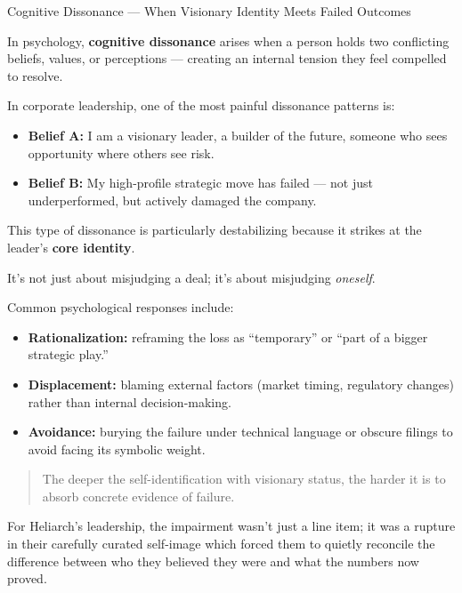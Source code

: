 \begin{PsychologicalSidebar}{Cognitive Dissonance --- When Visionary Identity Meets Failed Outcomes}

    In psychology, \textbf{cognitive dissonance} arises when a person holds two conflicting beliefs, values, or perceptions — creating an internal tension they feel compelled to resolve.
    
    \medskip
    
    In corporate leadership, one of the most painful dissonance patterns is:

    \medskip
    
    \begin{itemize}
        \item \textbf{Belief A:} I am a visionary leader, a builder of the future, someone who sees opportunity where others see risk.
        \item \textbf{Belief B:} My high-profile strategic move has failed — not just underperformed, but actively damaged the company.
    \end{itemize}
    
    \medskip
    
    This type of dissonance is particularly destabilizing because it strikes at the leader’s \textbf{core identity}.

    \medskip
    
    It’s not just about misjudging a deal; it’s about misjudging \textit{oneself}.
    
    \medskip
    
    Common psychological responses include:

    \medskip
    
    \begin{itemize}
        \item \textbf{Rationalization:} reframing the loss as “temporary” or “part of a bigger strategic play.”
        \item \textbf{Displacement:} blaming external factors (market timing, regulatory changes) rather than internal decision-making.
        \item \textbf{Avoidance:} burying the failure under technical language or obscure filings to avoid facing its symbolic weight.
    \end{itemize}
    
    \medskip
    
    \begin{quote}
        The deeper the self-identification with visionary status,  
        the harder it is to absorb concrete evidence of failure.
    \end{quote}
    
    For Heliarch’s leadership, the impairment wasn’t just a line item;  
    it was a rupture in their carefully curated self-image which  
    forced them to quietly reconcile the difference between who they believed they were  
    and what the numbers now proved.
    
\end{PsychologicalSidebar}

